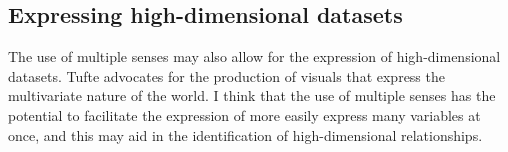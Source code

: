 \documentclass{acm_proc_article-sp}
\begin{document}
\subsection{Expressing high-dimensional datasets}
The use of multiple senses may also allow for the expression of
high-dimensional datasets. Tufte advocates for the production of
visuals that express the multivariate nature of the world.\cite{tufte}
I think that the use of multiple senses has the potential to
facilitate the expression of more easily express many variables at
once, and this may aid in the identification of high-dimensional
relationships.



\balancecolumns
\end{document}
